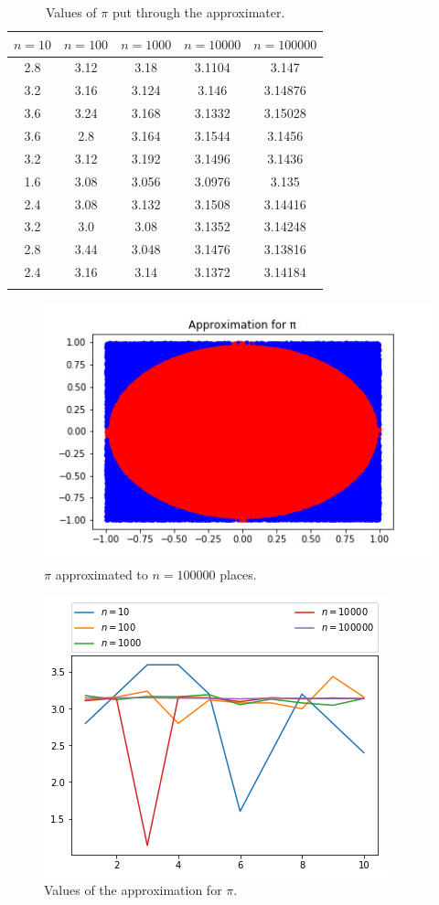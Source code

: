 \documentclass[12pt]{article}
\begin{document}
\begin{longtable}[]{@{}ccccc@{}}
\toprule
\(n = 10\) & \(n = 100\) & \(n = 1000\) & \(n = 10000\) &
\(n = 100000\)\tabularnewline
\midrule
\endhead
2.8 & 3.12 & 3.18 & 3.1104 & 3.147\tabularnewline
3.2 & 3.16 & 3.124 & 3.146 & 3.14876\tabularnewline
3.6 & 3.24 & 3.168 & 3.1332 & 3.15028\tabularnewline
3.6 & 2.8 & 3.164 & 3.1544 & 3.1456\tabularnewline
3.2 & 3.12 & 3.192 & 3.1496 & 3.1436\tabularnewline
1.6 & 3.08 & 3.056 & 3.0976 & 3.135\tabularnewline
2.4 & 3.08 & 3.132 & 3.1508 & 3.14416\tabularnewline
3.2 & 3.0 & 3.08 & 3.1352 & 3.14248\tabularnewline
2.8 & 3.44 & 3.048 & 3.1476 & 3.13816\tabularnewline
2.4 & 3.16 & 3.14 & 3.1372 & 3.14184\tabularnewline
\bottomrule
\caption{Values of $\pi$ put through the approximater.}
\end{longtable}


\begin{figure}[h]
\centering	
\includegraphics[scale=0.5]{pi_pictures/approx.jpg}
\caption{$\pi$ approximated to $n = 100000$ places.}
\end{figure}

\begin{figure}[h]
\centering
\includegraphics[scale=0.5]{pi_pictures/index.png} 
\caption{Values of the approximation for \(\pi\).}
\end{figure}
\end{document}

